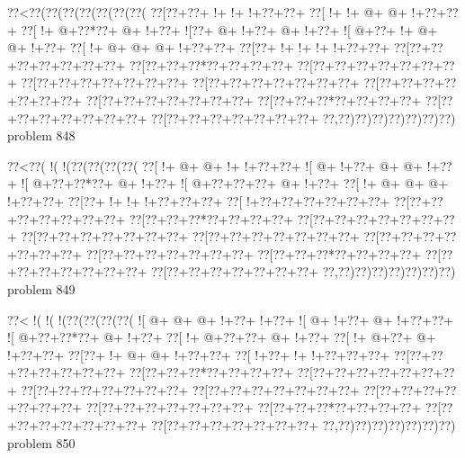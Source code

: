 \vbox{\vbox{\goo
\0??<\0??(\0??(\0??(\0??(\0??(\0??(\0??(
\0??[\0??+\0??+\- !+\- !+\- !+\0??+\0??+
\0??[\- !+\- !+\- @+\- @+\- !+\0??+\0??+
\0??[\- !+\- @+\0??*\0??+\- @+\- !+\0??+
\- ![\0??+\- @+\- !+\0??+\- @+\- !+\0??+
\- ![\- @+\0??+\- !+\- @+\- @+\- !+\0??+
\0??[\- !+\- @+\- @+\- @+\- !+\0??+\0??+
\0??[\0??+\- !+\- !+\- !+\- !+\0??+\0??+
\0??[\0??+\0??+\0??+\0??+\0??+\0??+\0??+
\0??[\0??+\0??+\0??*\0??+\0??+\0??+\0??+
\0??[\0??+\0??+\0??+\0??+\0??+\0??+\0??+
\0??[\0??+\0??+\0??+\0??+\0??+\0??+\0??+
\0??[\0??+\0??+\0??+\0??+\0??+\0??+\0??+
\0??[\0??+\0??+\0??+\0??+\0??+\0??+\0??+
\0??[\0??+\0??+\0??+\0??+\0??+\0??+\0??+
\0??[\0??+\0??+\0??*\0??+\0??+\0??+\0??+
\0??[\0??+\0??+\0??+\0??+\0??+\0??+\0??+
\0??[\0??+\0??+\0??+\0??+\0??+\0??+\0??+
\0??,\0??)\0??)\0??)\0??)\0??)\0??)\0??)
}
\hfil problem 848\hfil\break
}

\vbox{\vbox{\goo
\0??<\0??(\- !(\- !(\0??(\0??(\0??(\0??(
\0??[\- !+\- @+\- @+\- !+\- !+\0??+\0??+
\- ![\- @+\- !+\0??+\- @+\- @+\- !+\0??+
\- ![\- @+\0??+\0??*\0??+\- @+\- !+\0??+
\- ![\- @+\0??+\0??+\0??+\- @+\- !+\0??+
\0??[\- !+\- @+\- @+\- @+\- !+\0??+\0??+
\0??[\0??+\- !+\- !+\- !+\0??+\0??+\0??+
\0??[\- !+\0??+\0??+\0??+\0??+\0??+\0??+
\0??[\0??+\0??+\0??+\0??+\0??+\0??+\0??+
\0??[\0??+\0??+\0??*\0??+\0??+\0??+\0??+
\0??[\0??+\0??+\0??+\0??+\0??+\0??+\0??+
\0??[\0??+\0??+\0??+\0??+\0??+\0??+\0??+
\0??[\0??+\0??+\0??+\0??+\0??+\0??+\0??+
\0??[\0??+\0??+\0??+\0??+\0??+\0??+\0??+
\0??[\0??+\0??+\0??+\0??+\0??+\0??+\0??+
\0??[\0??+\0??+\0??*\0??+\0??+\0??+\0??+
\0??[\0??+\0??+\0??+\0??+\0??+\0??+\0??+
\0??[\0??+\0??+\0??+\0??+\0??+\0??+\0??+
\0??,\0??)\0??)\0??)\0??)\0??)\0??)\0??)
}
\hfil problem 849\hfil\break
}

\vbox{\vbox{\goo
\0??<\- !(\- !(\- !(\0??(\0??(\0??(\0??(
\- ![\- @+\- @+\- @+\- !+\0??+\- !+\0??+
\- ![\- @+\- !+\0??+\- @+\- !+\0??+\0??+
\- ![\- @+\0??+\0??*\0??+\- @+\- !+\0??+
\0??[\- !+\- @+\0??+\0??+\- @+\- !+\0??+
\0??[\- !+\- @+\0??+\- @+\- !+\0??+\0??+
\0??[\0??+\- !+\- @+\- @+\- !+\0??+\0??+
\0??[\- !+\0??+\- !+\- !+\0??+\0??+\0??+
\0??[\0??+\0??+\0??+\0??+\0??+\0??+\0??+
\0??[\0??+\0??+\0??*\0??+\0??+\0??+\0??+
\0??[\0??+\0??+\0??+\0??+\0??+\0??+\0??+
\0??[\0??+\0??+\0??+\0??+\0??+\0??+\0??+
\0??[\0??+\0??+\0??+\0??+\0??+\0??+\0??+
\0??[\0??+\0??+\0??+\0??+\0??+\0??+\0??+
\0??[\0??+\0??+\0??+\0??+\0??+\0??+\0??+
\0??[\0??+\0??+\0??*\0??+\0??+\0??+\0??+
\0??[\0??+\0??+\0??+\0??+\0??+\0??+\0??+
\0??[\0??+\0??+\0??+\0??+\0??+\0??+\0??+
\0??,\0??)\0??)\0??)\0??)\0??)\0??)\0??)
}
\hfil problem 850\hfil\break
}

